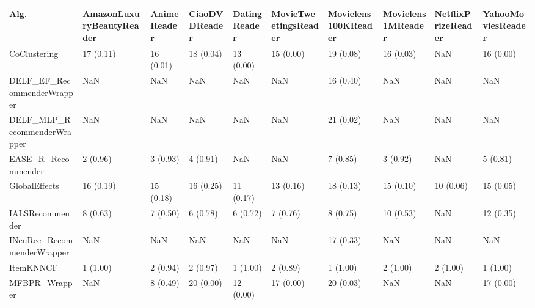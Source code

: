 \begin{tabular}{llllllllll}
\toprule
                               Alg. & AmazonLuxuryBeautyReader & AnimeReader & CiaoDVDReader & DatingReader & MovieTweetingsReader & Movielens100KReader & Movielens1MReader & NetflixPrizeReader & YahooMoviesReader \\
\midrule
                       CoClustering &                17 (0.11) &   16 (0.01) &     18 (0.04) &    13 (0.00) &            15 (0.00) &           19 (0.08) &         16 (0.03) &                NaN &         16 (0.00) \\
         DELF\_EF\_RecommenderWrapper &                      NaN &         NaN &           NaN &          NaN &                  NaN &           16 (0.40) &               NaN &                NaN &               NaN \\
        DELF\_MLP\_RecommenderWrapper &                      NaN &         NaN &           NaN &          NaN &                  NaN &           21 (0.02) &               NaN &                NaN &               NaN \\
                 EASE\_R\_Recommender &                 2 (0.96) &    3 (0.93) &      4 (0.91) &          NaN &                  NaN &            7 (0.85) &          3 (0.92) &                NaN &          5 (0.81) \\
                      GlobalEffects &                16 (0.19) &   15 (0.18) &     16 (0.25) &    11 (0.17) &            13 (0.16) &           18 (0.13) &         15 (0.10) &          10 (0.06) &         15 (0.05) \\
                    IALSRecommender &                 8 (0.63) &    7 (0.50) &      6 (0.78) &     6 (0.72) &             7 (0.76) &            8 (0.75) &         10 (0.53) &                NaN &         12 (0.35) \\
         INeuRec\_RecommenderWrapper &                      NaN &         NaN &           NaN &          NaN &                  NaN &           17 (0.33) &               NaN &                NaN &               NaN \\
                          ItemKNNCF &                 1 (1.00) &    2 (0.94) &      2 (0.97) &     1 (1.00) &             2 (0.89) &            1 (1.00) &          2 (1.00) &           2 (1.00) &          1 (1.00) \\
                      MFBPR\_Wrapper &                      NaN &    8 (0.49) &     20 (0.00) &    12 (0.00) &            17 (0.00) &           20 (0.03) &               NaN &                NaN &         17 (0.00) \\

\end{tabular}
